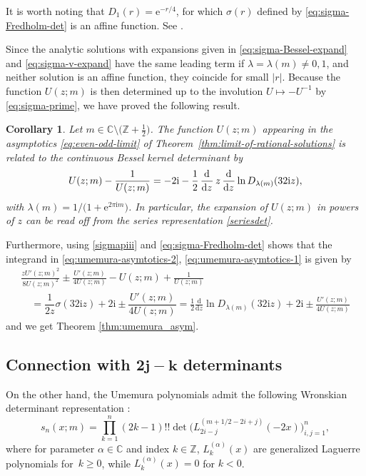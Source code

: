 \documentclass[pdftex]{sigma}
\numberwithin{equation}{section}
\newtheorem{Corollary}[Theorem]{Corollary}
\newcommand{\ee}{\mathrm{e}}
\newcommand{\dd}{\mathrm{d}}
\newcommand{\ii}{\mathrm{i}}
\begin{document}
\begin{Remark}
 It is worth noting that $D_1(r)=\ee^{-r/4}$, for which $\sigma(r)$ defined by \eqref{eq:sigma-Fredholm-det} is an affine function. See \cite{TWBessel}.
\end{Remark}

 Since the analytic solutions with expansions given in \eqref{eq:sigma-Bessel-expand} and \eqref{eq:sigma-v-expand} have the same leading term if $\lambda=\lambda(m)\neq 0,1$, and neither solution is an affine function, they coincide for small $|r|$. Because the function $U(z;m)$ is then determined up to the involution $U\mapsto -U^{-1}$ by \eqref{eq:sigma-prime}, we have proved the following result.

 \begin{Corollary} \label{cor:bessel-relation}
 Let $m\in\mathbb{C}\setminus\big(\mathbb{Z}+\tfrac{1}{2}\big)$. The function $U(z;m)$ appearing in the asymptotics \eqref{eq:even-odd-limit} of Theorem~{\rm \ref{thm:limit-of-rational-solutions}} is related to the continuous Bessel kernel determinant by
 \begin{gather*}
 U( z;m)-\frac1{U( z;m)}=-2\ii-\frac12\dod{}{z}z\dod{}{z}\ln D_{\lambda( m)}( 32\ii z),
 \end{gather*}
 with $\lambda( m)={1}/\big( 1+\ee^{2\pi \ii m}\big)$. In particular, the expansion of $U( z;m)$ in powers of $z$ can be read off from the series representation \eqref{seriesdet}.
 \end{Corollary}
Furthermore, using \eqref{sigmapiii} and \eqref{eq:sigma-Fredholm-det} shows that the integrand in \eqref{eq:umemura-asymtotics-2}, \eqref{eq:umemura-asymtotics-1} is given by
\begin{gather}
\frac{z U'(z;m)^2}{8 U(z;m)^2} \pm \frac{U'(z;m)}{4 U(z;m)}-U(z;m)+\frac{1}{U(z;m)} \nonumber\\
\quad= \dfrac{1}{2z}\sigma(32\ii z) + 2\ii \pm \dfrac{U'(z; m)}{4U(z; m)}=\frac{1}{2}\frac{\dd}{\dd z}\ln D_{\lambda(m)}(32\ii z) + 2\ii \pm\frac{U'(z;m)}{4U(z;m)}\label{eq:relation-to-bessel}
\end{gather}
and we get Theorem \ref{thm:umemura_asym}.

\subsection[Connection with 2j - k determinants]{Connection with $\boldsymbol{2j - k}$ determinants}
On the other hand, the Umemura polynomials admit the following Wronskian determinant representation \cite{Kajiwara_Masuda}:
\[ s_{n}(x;m)=\prod_{k=1}^n(2k-1)!!\det\big(L_{2i-j}^{(m+1/2-2i+j)}(-2x)\big)_{i,j=1}^{n},\]
where for parameter $\alpha\in\mathbb{C}$ and index $k\in\mathbb{Z}$, $L_{k}^{(\alpha)}(x)$ are generalized Laguerre polynomials for~$k\geq 0$, while $L_{k}^{(\alpha)}(x)=0$ for $k<0$.
\end{document}
